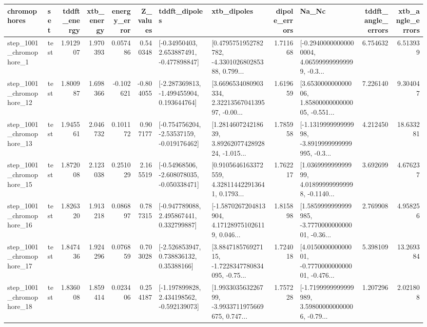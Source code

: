 \begin{tabular}{llrrrrllrlrr}
\toprule
             chromophores &       set &  tddft\_energy &  xtb\_energy &  energy\_error &  Z\_values &                               tddft\_dipoles &                                        xtb\_dipoles &  dipole\_errors &                                              Na\_Nc &  tddft\_angle\_errors &  xtb\_angle\_errors \\
\midrule
  step\_1001\_chromophore\_1 &      test &      1.912907 &    1.970393 &      0.057486 &  0.540348 &    [-0.34950403, 2.653887491, -0.477898847] &  [0.4795751952782782, -4.330102680285388, 0.799... &       1.711668 &  [-0.29400000000000004, 4.065999999999999, -0.3... &            6.754632 &          6.513939 \\
 step\_1001\_chromophore\_12 &      test &      1.800987 &    1.698366 &     -0.102621 & -0.804055 &   [-2.287369813, -1.499455904, 0.193644764] &  [3.6696534080903334, 2.3221356704139597, -0.00... &       1.619659 &  [3.653000000000006, 1.8580000000000005, -0.551... &            7.226140 &          9.304047 \\
 step\_1001\_chromophore\_13 &      test &      1.945561 &    2.046732 &      0.101172 &  0.907177 &   [-0.754756204, -2.53537159, -0.019176462] &  [1.281460724218639, 3.8926207742892824, -1.015... &       1.785958 &  [-1.131999999999998, -3.8919999999999995, -0.3... &            4.212450 &         18.633281 \\
 step\_1001\_chromophore\_15 &      test &      1.872008 &    2.123038 &      0.251029 &  2.165519 &   [-0.54968506, -2.608078035, -0.050338471] &  [0.9105646163372559, 4.328114422913641, 0.1793... &       1.762217 &  [1.036999999999999, 4.018999999999998, -0.1140... &            3.692699 &          4.676237 \\
 step\_1001\_chromophore\_16 &      test &      1.826320 &    1.913218 &      0.086897 &  0.787315 &    [-0.947789088, 2.495867441, 0.332799887] &  [-1.5870267204813904, 4.171289751026119, 0.046... &       1.815898 &  [1.5859999999999985, -3.777000000000001, -0.36... &            2.769908 &          4.958256 \\
 step\_1001\_chromophore\_17 &      test &      1.847436 &    1.924296 &      0.076859 &  0.703028 &     [-2.526853947, 0.738836132, 0.35388166] &  [3.884718576927115, -1.7228347780834095, -0.75... &       1.724018 &  [4.015000000000001, -0.777000000000001, -0.476... &            5.398109 &         13.269384 \\
 step\_1001\_chromophore\_18 &      test &      1.836008 &    1.859414 &      0.023406 &  0.254187 &   [-1.197899828, 2.434198562, -0.592139073] &  [1.993303563226799, -3.9933711975669675, 0.747... &       1.757228 &  [-1.7199999999999989, 3.598000000000006, -0.79... &            1.207296 &          2.021808 \\

\end{tabular}
